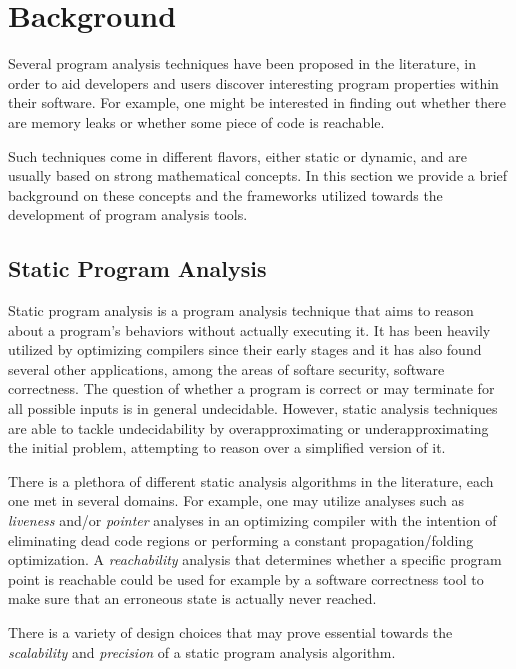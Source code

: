 
\chapter{Background}\label{c:background}

Several program analysis techniques have been proposed in the literature, in
order to aid developers and users discover interesting program properties within
their software. For example, one might be interested in finding out whether
there are memory leaks or whether some piece of code is reachable.

Such techniques come in different flavors, either static or dynamic, and are
usually based on strong mathematical concepts. In this section we provide 
a brief background on these concepts and the frameworks utilized towards 
the development of program analysis tools.

\section{Static Program Analysis}

Static program analysis is a program analysis technique that aims to reason
about a program's behaviors without actually executing it. It has been
heavily utilized by optimizing compilers since their early stages and it
has also found several other applications, among the areas of softare security,
software correctness\cite{spa}. The question of whether 
a program is correct or may terminate for all possible inputs is in general
undecidable. However, static analysis techniques are able to tackle
undecidability by overapproximating or underapproximating the initial problem,
attempting to reason over a simplified version of it.

%
%

There is a plethora of different static analysis algorithms in the literature, each one
met in several domains. For example, one may utilize analyses such as \emph{liveness} and/or 
\emph{pointer} analyses in an optimizing compiler with the intention of eliminating
dead code regions or performing a constant propagation/folding optimization.
A \emph{reachability} analysis that determines whether a specific program point is 
reachable could be used for example by a software correctness tool to make sure that
an erroneous state is actually never reached.

There is a variety of design choices that may prove essential towards the \emph{scalability}
and \emph{precision} of a static program analysis algorithm.

